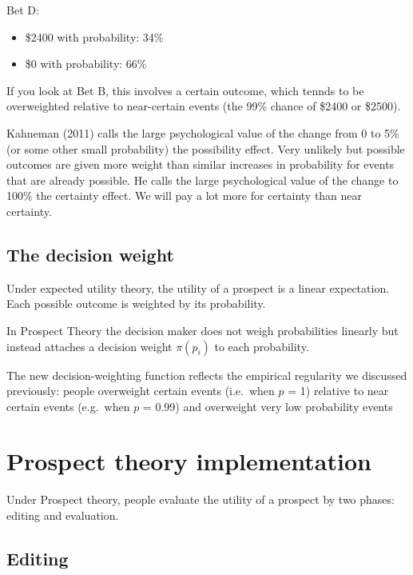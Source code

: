\documentclass[
  letterpaper,
  DIV=11,
  numbers=noendperiod]{scrreprt}
\providecommand{\tightlist}{%
  \setlength{\itemsep}{0pt}\setlength{\parskip}{0pt}}\usepackage{longtable,booktabs,array}
\begin{document}
Bet D:

\begin{itemize}
\tightlist
\item
  \$2400 with probability: 34\%
\item
  \$0 with probability: 66\%
\end{itemize}

If you look at Bet B, this involves a certain outcome, which tennds to
be overweighted relative to near-certain events (the 99\% chance of
\$2400 or \$2500).

Kahneman (2011) calls the large psychological value of the change from 0
to 5\% (or some other small probability) the possibility effect. Very
unlikely but possible outcomes are given more weight than similar
increases in probability for events that are already possible. He calls
the large psychological value of the change to 100\% the certainty
effect. We will pay a lot more for certainty than near certainty.

\hypertarget{the-decision-weight}{%
\section{The decision weight}\label{the-decision-weight}}

Under expected utility theory, the utility of a prospect is a linear
expectation. Each possible outcome is weighted by its probability.

In Prospect Theory the decision maker does not weigh probabilities
linearly but instead attaches a decision weight \(\pi(p_i)\) to each
probability.

The new decision-weighting function reflects the empirical regularity we
discussed previously: people overweight certain events (i.e.~when \(p\)
= 1) relative to near certain events (e.g.~when \(p\) = 0.99) and
overweight very low probability events

\hypertarget{prospect-theory-implementation}{%
\chapter{Prospect theory
implementation}\label{prospect-theory-implementation}}

Under Prospect theory, people evaluate the utility of a prospect by two
phases: editing and evaluation.

\hypertarget{editing}{%
\section{Editing}\label{editing}}
\end{document}
